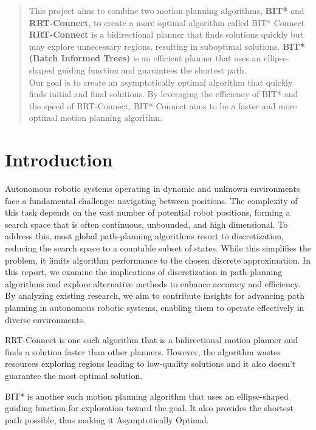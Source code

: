 \documentclass[12pt]{report}
\begin{document}
\begin{abstract}
  \font This project aims to combine two motion planning algorithms, \textbf{BIT*} and \textbf{RRT-Connect}, to create a more optimal algorithm called BIT* Connect.\\
  \textbf{RRT-Connect} is a bidirectional planner that finds solutions quickly but may explore unnecessary regions, resulting in suboptimal solutions. \textbf{BIT*(Batch Informed Trees)} is an efficient planner that uses an ellipse-shaped guiding function and guarantees the shortest path.\\
  Our goal is to create an asymptotically optimal algorithm that quickly finds initial and final solutions. By leveraging the efficiency of BIT* and the speed of RRT-Connect, BIT* Connect aims to be a faster and more optimal motion planning algorithm.
\end{abstract}

\tableofcontents

\chapter{Introduction}
Autonomous robotic systems operating in dynamic and unknown environments face a fundamental challenge: navigating between positions. The complexity of this task depends on the vast number of potential robot positions, forming a search space that is often continuous, unbounded, and high dimensional. To address this, most global path-planning algorithms resort to discretization, reducing the search space to a countable subset of states. While this simplifies the problem, it limits algorithm performance to the chosen discrete approximation. In this report, we examine the implications of discretization in path-planning algorithms and explore alternative methods to enhance accuracy and efficiency. By analyzing existing research, we aim to contribute insights for advancing path planning in autonomous robotic systems, enabling them to operate effectively in diverse environments.


RRT-Connect is one such algorithm that is a bidirectional motion planner and finds a solution faster than other planners. However, the algorithm wastes resources exploring regions leading to low-quality solutions and it also doesn’t guarantee the most optimal solution. 


BIT* is another such motion planning algorithm that uses an ellipse-shaped guiding function for exploration toward the goal. It also provides the shortest path possible, thus making it Asymptotically Optimal.
\end{document}

